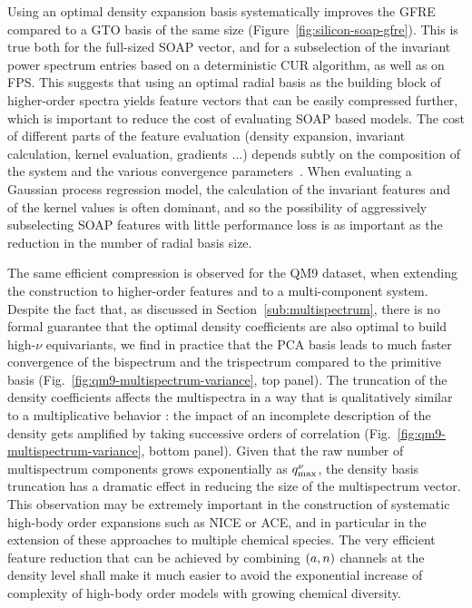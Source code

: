 Using an optimal density expansion basis systematically improves the GFRE compared to a GTO basis of the same size (Figure~\ref{fig:silicon-soap-gfre}).  
This is true both for the full-sized SOAP vector, and for a subselection of the invariant power spectrum entries based on a deterministic CUR algorithm, as well as on FPS.
This suggests that using an optimal radial basis as the building block of higher-order spectra yields feature vectors that can be easily compressed further, which is important to reduce the cost of evaluating SOAP based models.
The cost of different parts of the feature evaluation (density expansion, invariant calculation, kernel evaluation, gradients ...)  depends subtly on the composition of the system and the various convergence parameters~\cite{musil2021efficient}. When evaluating a Gaussian process regression model, the calculation of the invariant features and of the kernel values is often dominant, and so the possibility of aggressively subselecting SOAP features with little performance loss is as important as the reduction in the number of radial basis size.


The same efficient compression is observed for the QM9 dataset, when extending the construction to higher-order features and to a multi-component system. Despite the fact that, as discussed in Section~\ref{sub:multispectrum}, there is no formal guarantee that the optimal density coefficients are also optimal to build high-$\nu$ equivariants,
we find in practice that the PCA basis leads to much faster convergence of the bispectrum and the trispectrum compared to the primitive basis (Fig.~\ref{fig:qm9-multispectrum-variance}, top panel). 
The truncation of the density coefficients affects the multispectra in a way that is qualitatively similar to a multiplicative behavior 
: the impact of an incomplete description of the density gets amplified by taking successive orders of correlation (Fig.~\ref{fig:qm9-multispectrum-variance}, bottom panel). 
Given that the raw number of multispectrum components grows exponentially as $q_\mathrm{max}^\nu$, the density basis truncation has a dramatic effect in reducing the size of the multispectrum vector.  This observation may be extremely important in the construction of systematic high-body order expansions such as NICE or ACE, and in particular in the extension of these approaches to multiple chemical species.
The very efficient feature reduction that can be achieved by combining $(a,n)$ channels at the density level shall make it much easier to avoid the exponential increase of complexity of high-body order models with growing chemical diversity. 


